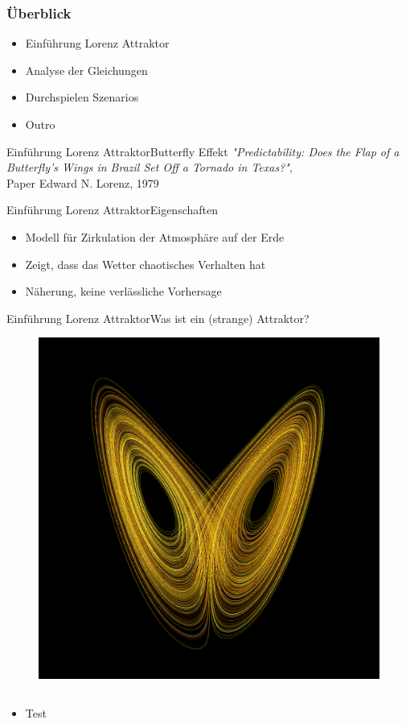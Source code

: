 \documentclass[presentation.tex]{subfiles}
\begin{document}
	\frame{\titlepage}
    
    \begin{frame}
        \frametitle{Überblick}
        \begin{itemize}
            \item Einführung Lorenz Attraktor
            \item Analyse der Gleichungen
            \item Durchspielen Szenarios
            \item Outro
        \end{itemize}
    \end{frame}
    
    \begin{frame}{Einführung Lorenz Attraktor}{Butterfly Effekt}
		\textit{"Predictability: Does the Flap of a Butterfly's Wings in Brazil Set Off a Tornado in Texas?"}, \\
		Paper Edward N. Lorenz, 1979
    \end{frame}
    
    \begin{frame}{Einführung Lorenz Attraktor}{Eigenschaften}
    	\begin{itemize}
    		\item Modell für Zirkulation der Atmosphäre auf der Erde
    		\item Zeigt, dass das Wetter chaotisches Verhalten hat
    		\item Näherung, keine verlässliche Vorhersage
    	\end{itemize}
    \end{frame}
    
    \begin{frame}{Einführung Lorenz Attraktor}{Was ist ein (strange) Attraktor?}
		
		\begin{figure}
			\centering
			\includegraphics[width=0.4\linewidth]{Attractor}
			\label{fig:Attractor}
		\end{figure}
		
		
		\begin{columns}[T]
			\begin{column}{.6\textwidth}
				\begin{itemize}
					\item Test
				\end{itemize}
			\end{column}
			\begin{column}[t]{.4\textwidth}
			\end{column}
		\end{columns}

    \end{frame}
    
\end{document}
